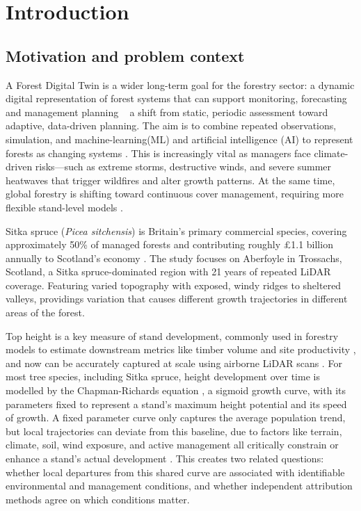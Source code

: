 \documentclass[logo,msc,ai]{infthesis}           %
\begin{document}
\chapter{Introduction} \label{chap:introduction}

\section{Motivation and problem context}
A Forest Digital Twin is a wider long-term goal for the forestry sector: a dynamic digital representation of forest systems that can support monitoring, forecasting and management planning ~ a shift from static, periodic assessment toward adaptive, data-driven planning. The aim is to combine repeated observations, simulation, and machine-learning(ML) and artificial intelligence (AI) to represent forests as changing systems \cite{baskent2026Review_C1_SS, buonocore2022Proposal_C1_SS}. This is increasingly vital as managers face climate-driven risks—such as extreme storms, destructive winds, and severe summer heatwaves that trigger wildfires and alter growth patterns. At the same time, global forestry is shifting toward continuous cover management, requiring more flexible stand-level models \cite{ForestResearch2009Evidence_C1_SS}. 

Sitka spruce (\textit{Picea sitchensis}) is Britain's primary commercial species, covering approximately 50\% of managed forests \cite{ForestResearch2026Sitka_C1_SS} and contributing roughly \pounds1.1 billion annually to Scotland's economy \cite{ScottishForestry2026Future_C1_SS, mason2011Sitka_C1_SS}. The study focuses on Aberfoyle in Trossachs, Scotland, a Sitka spruce-dominated region with 21 years of repeated LiDAR coverage. Featuring varied topography with exposed, windy ridges to sheltered valleys, providings variation that causes different growth trajectories in different areas of the forest. 

Top height is a key measure of stand development, commonly used in forestry models to estimate downstream metrics like timber volume and site productivity \cite{ForestResearch2026Sitka_C1_SS}, and now can be accurately captured at scale using airborne LiDAR scans \cite{suarezminguez2008Practical_C1_SS}. For most tree species, including Sitka spruce, height development over time is modelled by the Chapman-Richards equation \cite{pommerening2015Methods_C2_CR}, a sigmoid growth curve, with its parameters fixed to represent a stand's maximum height potential and its speed of growth. A fixed parameter curve only captures the average population trend, but local trajectories can deviate from this baseline, due to factors like terrain, climate, soil, wind exposure, and active management all critically constrain or enhance a stand's actual development \cite{socha2023Higher_C1_SS, cameron2015Building_C1_SS}. This creates two related questions: whether local departures from this shared curve are associated with identifiable environmental and management conditions, and whether independent attribution methods agree on which conditions matter.
\end{document}
